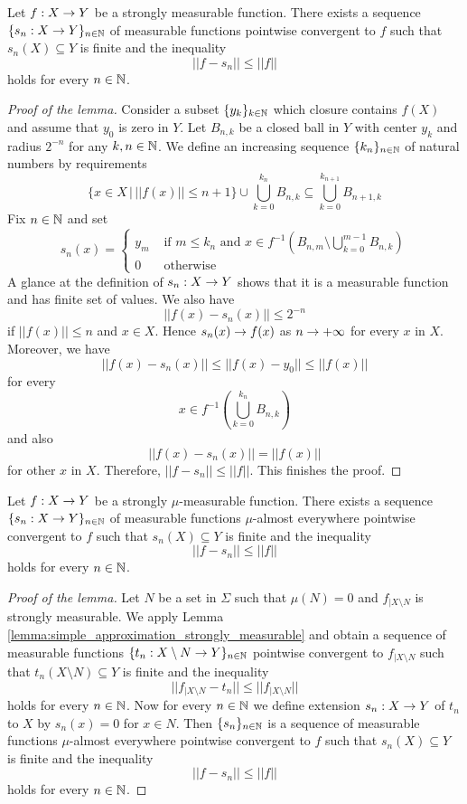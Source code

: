 \begin{lemma}\label{lemma:simple_approximation_strongly_measurable}
Let $f:X\rightarrow Y$ be a strongly measurable function. There exists a sequence $\{s_n:X\rightarrow Y\}_{n\in {\mathbb N}}$ of measurable functions pointwise convergent to $f$ such that $s_n(X)\subseteq Y$ is finite and the inequality
$$||f - s_n||\leq ||f||$$
holds for every $n\in {\mathbb N}$.
\end{lemma}
\begin{proof}[Proof of the lemma]
Consider a subset $\{y_k\}_{k\in {\mathbb N}}$ which closure contains $f(X)$ and assume that $y_0$ is zero in $Y$. Let $B_{n,k}$ be a closed ball in $Y$ with center $y_k$ and radius $2^{-n}$ for any $k,n\in {\mathbb N}$. We define an increasing sequence $\{k_n\}_{n\in {\mathbb N}}$ of natural numbers by requirements
$$\big\{x \in X\,\big|\,||f(x)||\leq n+1\big\} \cup \bigcup_{k=0}^{k_n}B_{n, k}\subseteq \bigcup_{k=0}^{k_{n+1}}B_{n+1, k}$$
Fix $n\in {\mathbb N}$ and set
$$s_n(x) = \begin{cases}
y_m & \mbox{ if }m\leq k_n\mbox{ and }x\in f^{-1}\left(B_{n, m}\setminus \bigcup_{k=0}^{m-1}B_{n, k}\right)\\
0 & \mbox{ otherwise}
\end{cases}$$
A glance at the definition of $s_n:X\rightarrow Y$ shows that it is a measurable function and has finite set of values. We also have
$$||f(x) - s_n(x)||\leq 2^{-n}$$
if $||f(x)||\leq n$ and $x \in X$. Hence $s_n(x) \rightarrow f(x)$ as $n\rightarrow +\infty$ for every $x$ in $X$. Moreover, we have
$$||f(x) - s_n(x)||\leq ||f(x) - y_0||\leq ||f(x)||$$
for every
$$x\in f^{-1}\left(\bigcup_{k=0}^{k_n}B_{n,k}\right)$$
and also
$$||f(x) - s_n(x)|| = ||f(x)||$$
for other $x$ in $X$. Therefore, $||f - s_n||\leq ||f||$. This finishes the proof.
\end{proof}

\begin{lemma}\label{lemma:simple_approximation_mu_strongly_measurable}
Let $f:X\rightarrow Y$ be a strongly $\mu$-measurable function. There exists a sequence $\{s_n:X\rightarrow Y\}_{n\in {\mathbb N}}$ of measurable functions $\mu$-almost everywhere pointwise convergent to $f$ such that $s_n(X)\subseteq Y$ is finite and the inequality
$$||f - s_n||\leq ||f||$$
holds for every $n\in {\mathbb N}$.
\end{lemma}
\begin{proof}[Proof of the lemma]
Let $N$ be a set in $\Sigma$ such that $\mu(N) = 0$ and $f_{\mid X\setminus N}$ is strongly measurable. We apply Lemma \ref{lemma:simple_approximation_strongly_measurable} and obtain a sequence of measurable functions $\{t_n:X\setminus N\rightarrow Y\}_{n\in {\mathbb N}}$ pointwise convergent to $f_{\mid X\setminus N}$ such that $t_n(X\setminus N)\subseteq Y$ is finite and the inequality
$$||f_{\mid X\setminus N} - t_n||\leq ||f_{\mid X\setminus N}||$$
holds for every $n\in {\mathbb N}$. Now for every $n\in {\mathbb N}$ we define extension $s_n:X\rightarrow Y$ of $t_n$ to $X$ by $s_n(x) = 0$ for $x\in N$. Then $\{s_n\}_{n\in {\mathbb N}}$ is a sequence of measurable functions $\mu$-almost everywhere pointwise convergent to $f$ such that $s_n(X)\subseteq Y$ is finite and the inequality
$$||f - s_n||\leq ||f||$$
holds for every $n\in {\mathbb N}$.
\end{proof}

